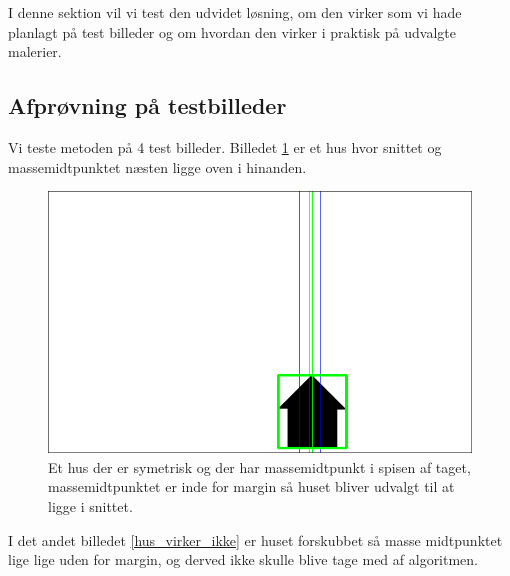 {\sffamily
I denne sektion vil vi test den udvidet løsning, om den virker som vi
hade planlagt på test billeder og om hvordan den virker i praktisk på
udvalgte malerier.
}
\subsection{Afprøvning på testbilleder}
Vi teste metoden på 4 test billeder. Billedet \ref{hus_virker} er et hus
hvor snittet og massemidtpunktet næsten ligge oven i hinanden. 

\begin{figure}[h!!]
	\begin{center}
		\includegraphics[scale=0.3,angle=0]{afsnit/afprovning/billeder/udvidet_losning/udvidet_hus1_test.png}
	\end{center}
	\caption[]{Et hus der er symetrisk og der har massemidtpunkt i spisen af taget, massemidtpunktet er inde for margin så huset bliver udvalgt til at ligge i snittet.}
	\label{hus_virker}
\end{figure}

I det andet billedet \ref{hus_virker_ikke} er huset forskubbet så masse
midtpunktet lige lige uden for margin, og derved ikke skulle blive tage
med af algoritmen. 

